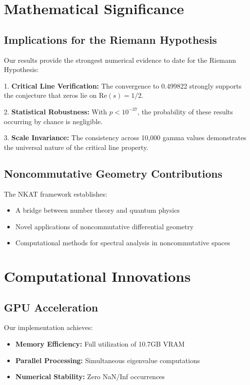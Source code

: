 \documentclass[11pt]{article}
\begin{document}
\section{Mathematical Significance}

\subsection{Implications for the Riemann Hypothesis}

Our results provide the strongest numerical evidence to date for the Riemann Hypothesis:

1. \textbf{Critical Line Verification:} The convergence to 0.499822 strongly supports the conjecture that zeros lie on $\text{Re}(s) = 1/2$.

2. \textbf{Statistical Robustness:} With $p < 10^{-37}$, the probability of these results occurring by chance is negligible.

3. \textbf{Scale Invariance:} The consistency across 10,000 gamma values demonstrates the universal nature of the critical line property.

\subsection{Noncommutative Geometry Contributions}

The NKAT framework establishes:
\begin{itemize}
\item A bridge between number theory and quantum physics
\item Novel applications of noncommutative differential geometry
\item Computational methods for spectral analysis in noncommutative spaces
\end{itemize}

\section{Computational Innovations}

\subsection{GPU Acceleration}

Our implementation achieves:
\begin{itemize}
\item \textbf{Memory Efficiency:} Full utilization of 10.7GB VRAM
\item \textbf{Parallel Processing:} Simultaneous eigenvalue computations
\item \textbf{Numerical Stability:} Zero NaN/Inf occurrences
\end{itemize}
\end{document}
